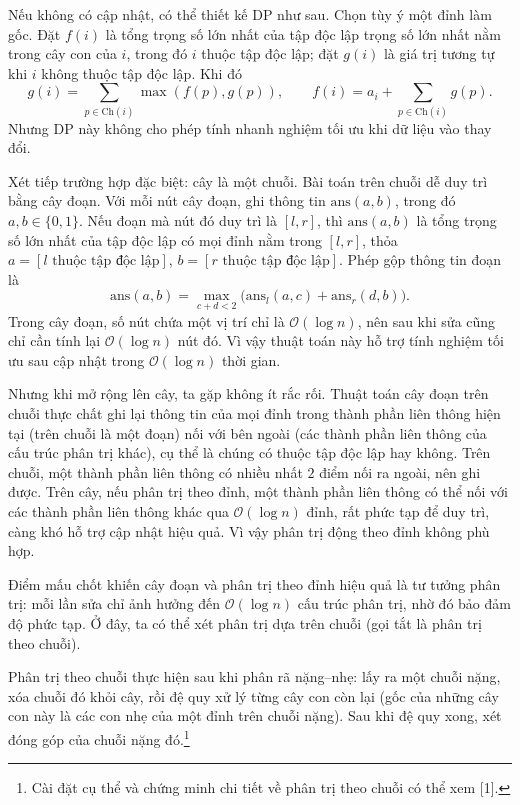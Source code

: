 \documentclass[11pt]{article}
\newcommand{\Oh}{\mathcal{O}}
\begin{document}
Nếu không có cập nhật, có thể thiết kế DP như sau. Chọn tùy ý một đỉnh làm
gốc. Đặt \(f(i)\) là tổng trọng số lớn nhất của tập độc lập trọng số lớn nhất
nằm trong cây con của \(i\), trong đó \(i\) thuộc tập độc lập; đặt \(g(i)\) là
giá trị tương tự khi \(i\) không thuộc tập độc lập. Khi đó
\[
  g(i)=\sum_{p\in\mathrm{Ch}(i)}\max(f(p),g(p)),
  \qquad
  f(i)=a_i+\sum_{p\in\mathrm{Ch}(i)}g(p).
\]
Nhưng DP này không cho phép tính nhanh nghiệm tối ưu khi dữ liệu vào thay đổi.

Xét tiếp trường hợp đặc biệt: cây là một chuỗi. Bài toán trên chuỗi dễ duy trì
bằng cây đoạn. Với mỗi nút cây đoạn, ghi thông tin \(\mathrm{ans}(a,b)\), trong
đó \(a,b\in\{0,1\}\). Nếu đoạn mà nút đó duy trì là \([l,r]\), thì
\(\mathrm{ans}(a,b)\) là tổng trọng số lớn nhất của tập độc lập có mọi đỉnh
nằm trong \([l,r]\), thỏa \(a=[l\text{ thuộc tập độc lập}]\),
\(b=[r\text{ thuộc tập độc lập}]\). Phép gộp thông tin đoạn là
\[
  \mathrm{ans}(a,b)=\max_{c+d<2}\bigl(\mathrm{ans}_l(a,c)+\mathrm{ans}_r(d,b)\bigr).
\]
Trong cây đoạn, số nút chứa một vị trí chỉ là \(\Oh(\log n)\), nên sau khi sửa
cũng chỉ cần tính lại \(\Oh(\log n)\) nút đó. Vì vậy thuật toán này hỗ trợ
tính nghiệm tối ưu sau cập nhật trong \(\Oh(\log n)\) thời gian.

Nhưng khi mở rộng lên cây, ta gặp không ít rắc rối. Thuật toán cây đoạn trên
chuỗi thực chất ghi lại thông tin của mọi đỉnh trong thành phần liên thông
hiện tại (trên chuỗi là một đoạn) nối với bên ngoài (các thành phần liên thông
của cấu trúc phân trị khác), cụ thể là chúng có thuộc tập độc lập hay không.
Trên chuỗi, một thành phần liên thông có nhiều nhất \(2\) điểm nối ra ngoài,
nên ghi được. Trên cây, nếu phân trị theo đỉnh, một thành phần liên thông có
thể nối với các thành phần liên thông khác qua \(\Oh(\log n)\) đỉnh, rất phức
tạp để duy trì, càng khó hỗ trợ cập nhật hiệu quả. Vì vậy phân trị động theo
đỉnh không phù hợp.

Điểm mấu chốt khiến cây đoạn và phân trị theo đỉnh hiệu quả là tư tưởng phân
trị: mỗi lần sửa chỉ ảnh hưởng đến \(\Oh(\log n)\) cấu trúc phân trị, nhờ đó
bảo đảm độ phức tạp. Ở đây, ta có thể xét phân trị dựa trên chuỗi (gọi tắt là
phân trị theo chuỗi).

Phân trị theo chuỗi thực hiện sau khi phân rã nặng--nhẹ: lấy ra một chuỗi
nặng, xóa chuỗi đó khỏi cây, rồi đệ quy xử lý từng cây con còn lại (gốc của
những cây con này là các con nhẹ của một đỉnh trên chuỗi nặng). Sau khi đệ
quy xong, xét đóng góp của chuỗi nặng đó.\footnote{Cài đặt cụ thể và chứng
minh chi tiết về phân trị theo chuỗi có thể xem [1].}
\end{document}
